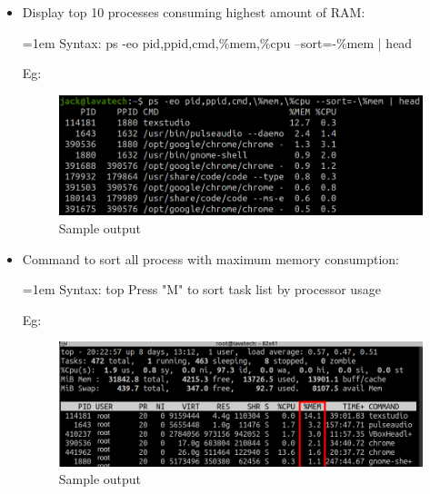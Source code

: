 \begin{flushleft}
\begin{itemize}
	\item Display top 10 processes consuming highest amount of RAM:
	\bigskip
	\begin{tcolorbox}[breakable,notitle,boxrule=-0pt,colback=pink,colframe=pink]
		\color{black}
		\font=1em
		Syntax: ps -eo pid,ppid,cmd,\%mem,\%cpu --sort=-\%mem | head
		\font=4pt
	\end{tcolorbox}
	Eg:
	\begin{figure}[h!]
		\centering
		\includegraphics[scale=.3]{content/chapter12/images/ps_1.png}
		\caption{Sample output}
		\label{fig:ps_1}
	\end{figure}
	\newpage
	\item Command to sort all process with maximum memory consumption:
		\bigskip
	\begin{tcolorbox}[breakable,notitle,boxrule=-0pt,colback=pink,colframe=pink]
		\color{black}
		\font=1em
		Syntax: top
		\newline
		\color{blue}
		Press "M" to sort task list by processor usage
		\font=4pt
	\end{tcolorbox}
	Eg:
	\begin{figure}[h!]
		\centering
		\includegraphics[scale=.4]{content/chapter12/images/mem.png}
		\caption{Sample output}
		\label{fig:cpu25}
	\end{figure}
	
	
\end{itemize}


\end{flushleft}
